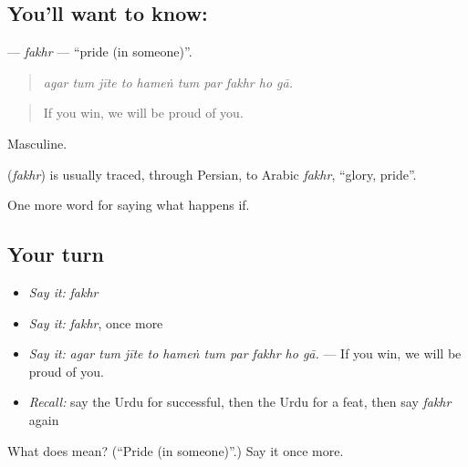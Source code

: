 \subsection*{You'll want to know: }
\textbf{} — \emph{fakhr} — \textquotedblleft{}pride (in someone)\textquotedblright{}.

\begin{quote}
         
\end{quote}

\begin{quote}
\emph{agar tum jīte to hameṅ tum par fakhr ho gā.}
\end{quote}

\begin{quote}
If you win, we will be proud of you.
\end{quote}

Masculine.

\begin{cousinweb}
\textbf{} (\emph{fakhr}) is usually traced, through Persian, to Arabic \emph{fakhr}, \textquotedblleft{}glory, pride\textquotedblright{}.
\end{cousinweb}

\begin{grammarlens}[title={What you've built}]
One more word for saying what happens if.
\end{grammarlens}

\subsection*{Your turn}
\begin{itemize}
\raggedright
  \item \emph{Say it:} \emph{fakhr}
  \item \emph{Say it:} \emph{fakhr}, once more
  \item \emph{Say it:} \emph{agar tum jīte to hameṅ tum par fakhr ho gā.} — If you win, we will be proud of you.
  \item \emph{Recall:} say the Urdu for successful, then the Urdu for a feat, then say \emph{fakhr} again
\end{itemize}

\begin{tcolorbox}[breakable,colback=teal!4,colframe=teal!35!black,title={Before you move on}]
What does  mean? (\textquotedblleft{}Pride (in someone)\textquotedblright{}.) Say it once more.
\end{tcolorbox}
